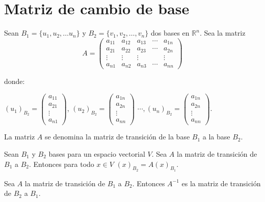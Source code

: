 \section{Matriz de cambio de base}
\begin{defin}
Sean $B_1 = \{u_1 , u_2, \dots u_n\}$ y $B_2 = \{ v_1,v_2, \dots, v_n \}$ dos bases en $\mathbb{R}^n$. Sea la matriz 
$$A = \begin{pmatrix} a_{11} & a_{12} & a_{13} & \cdots & a_{1n} \\ a_{21} & a_{22} & a_{23} & \cdots & a_{2n} \\ \vdots & \vdots & \vdots & & \vdots \\ a_{n1} & a_{n2} & a_{n3} & \cdots & a_{nn} \end{pmatrix}$$

 donde:
\begin{center}
     $(u_1)_{B_2} = \begin{pmatrix} a_{11} \\ a_{21} \\ \vdots \\ a_{n1} \end{pmatrix}$, $(u_2)_{B_2} = \begin{pmatrix} a_{1n} \\ a_{2n} \\ \vdots \\ a_{nn} \end{pmatrix}$ $\cdots, (u_n)_{B_2} = \begin{pmatrix} a_{1n} \\ a_{2n} \\ \vdots \\ a_{nn} \end{pmatrix}$. 
\end{center}
La matriz $A$ se denomina la matriz de transición de la base $B_1$ a la base $B_2$.
\end{defin}




\begin{thm}
Sean $B_1$ y $B_2$ bases para un espacio vectorial $V$. Sea $A$ la matriz de transición de $B_1$ a $B_2$. Entonces para todo $x \in V$ $(x)_{B_2} = A(x)_{B_1} $.
\end{thm}

\begin{thm}
Sea $A$ la matriz de transición de $B_1$ a $B_2$. Entonces $A^{-1}$ es la matriz de transición de $B_2$ a $B_1$.
\end{thm}

